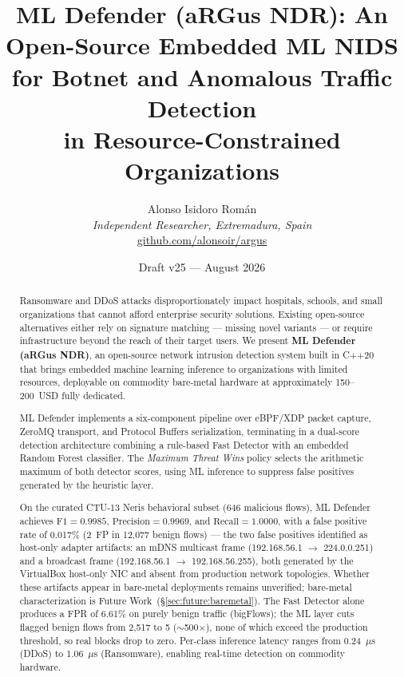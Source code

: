 \documentclass[11pt,a4paper]{article}
\title{\textbf{ML Defender (aRGus NDR): An Open-Source Embedded ML NIDS\\
for Botnet and Anomalous Traffic Detection\\
in Resource-Constrained Organizations}}
\author{
    Alonso Isidoro Rom\'an\\
    \textit{Independent Researcher, Extremadura, Spain}\\
    \href{https://github.com/alonsoir/argus}{github.com/alonsoir/argus}
}
\date{Draft v25 --- August 2026}
\begin{document}

    \maketitle

    \begin{abstract}
        Ransomware and DDoS attacks disproportionately impact hospitals, schools, and small
        organizations that cannot afford enterprise security solutions. Existing open-source
        alternatives either rely on signature matching --- missing novel variants --- or require
        infrastructure beyond the reach of their target users. We present \textbf{ML Defender
            (aRGus NDR)}, an open-source network intrusion detection system built in C++20 that brings
        embedded machine learning inference to organizations with limited resources, deployable on
        commodity bare-metal hardware at approximately 150--200~USD fully dedicated.

        ML Defender implements a six-component pipeline over eBPF/XDP packet capture, ZeroMQ
        transport, and Protocol Buffers serialization, terminating in a dual-score detection
        architecture combining a rule-based Fast Detector with an embedded Random Forest classifier.
        The \emph{Maximum Threat Wins} policy selects the arithmetic maximum of both detector scores,
        using ML inference to suppress false positives generated by the heuristic layer.

        On the curated CTU-13 Neris behavioral subset (646 malicious flows), ML Defender achieves
        $\text{F1} = 0.9985$, $\text{Precision} = 0.9969$, and $\text{Recall} = 1.0000$,
        with a false positive rate of 0.017\% (2~FP in 12,077 benign flows) --- the two false
        positives identified as host-only adapter artifacts: an mDNS multicast frame
        (192.168.56.1 $\to$ 224.0.0.251) and a broadcast frame (192.168.56.1 $\to$
        192.168.56.255), both generated by the VirtualBox host-only NIC and absent from
        production network topologies. Whether these artifacts appear in bare-metal deployments
        remains unverified; bare-metal characterization is Future Work~(\S\ref{sec:future:baremetal}).
        The Fast Detector alone produces a FPR of 6.61\% on purely benign
        traffic (bigFlows); the ML layer cuts flagged benign flows from 2,517 to 5
        (${\sim}$500$\times$), none of which exceed the production threshold, so real blocks
        drop to zero. Per-class inference latency ranges from
        0.24~$\mu$s (DDoS) to 1.06~$\mu$s (Ransomware), enabling real-time detection on commodity
        hardware.


\end{abstract}
\end{document}

